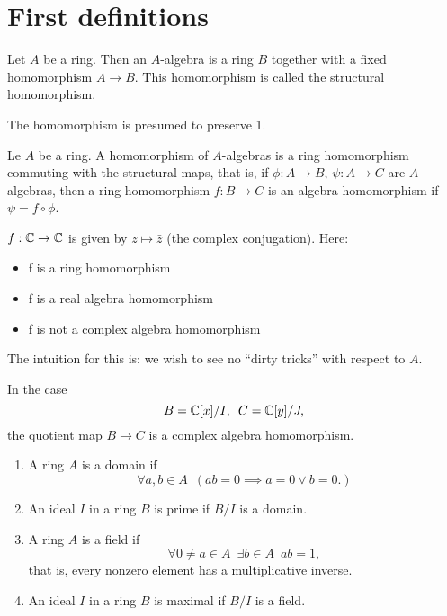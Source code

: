 \section{First definitions}

\begin{df}
Let $A$ be a ring. Then an $A$-algebra is a ring $B$ together with a fixed homomorphism $A \to B$. This homomorphism is called the structural homomorphism.

The homomorphism is presumed to preserve 1.
\end{df}

\begin{df}
  Le $A$ be a ring. A homomorphism of $A$-algebras is a ring homomorphism commuting with the structural maps, that is, if $\phi: A \to B$, $\psi: A \to C$ are $A$-algebras, then a ring homomorphism $f:B \to C$ is an algebra homomorphism if $\psi = f \circ \phi$.
\end{df}

\begin{example}
  $f: \mathbb C \to \mathbb C$ is given by $z \mapsto \bar z$ (the complex conjugation). Here:
\begin{itemize}
\item f is a ring homomorphism
\item f is a real algebra homomorphism
\item f is not a complex algebra homomorphism
\end{itemize}
The intuition for this is: we wish to see no ``dirty tricks'' with respect to $A$.
\end{example}

\begin{example}
  In the case
  \[ B = \mathbb C [x] / {I}, \enspace C = \mathbb C [y] / {J},\]
  the quotient map $B \to C$ is a complex algebra homomorphism.
\end{example}

\begin{df}
\mbox{}
\begin{enumerate}
\item A ring $A$ is a domain if
  \[\forall a,b \in A \enspace ( ab = 0 \implies a = 0 \lor b = 0. )\]
\item An ideal $I$ in a ring $B$ is prime if $B/{I}$ is a domain.
\item A ring $A$ is a field if
  \[\forall 0 \neq a \in A \enspace \exists b \in A \enspace ab = 1,\] that is, every nonzero element has a multiplicative inverse.
\item An ideal $I$ in a ring $B$ is maximal if $B/{I}$ is a field.
\end{enumerate}
\end{df}


